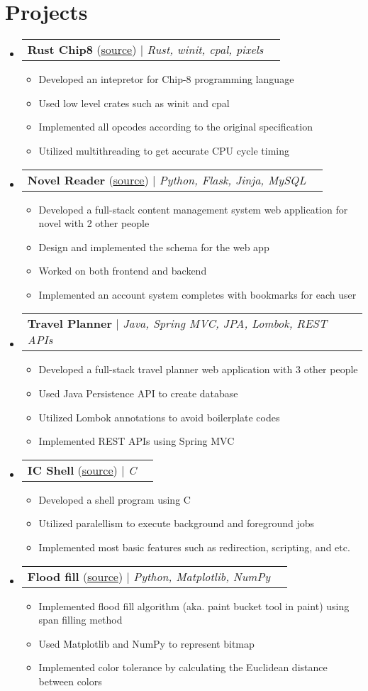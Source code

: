\documentclass[letterpaper,11pt]{article}
\makeatletter
\newcommand{\resumeItem}[1]{
  \item\small{
    {#1 \vspace{-2pt}}
  }
}
\newcommand{\resumeProjectHeading}[2]{
    \item
    \begin{tabular*}{0.97\textwidth}{l@{\extracolsep{\fill}}r}
      \small#1 & #2 \\
    \end{tabular*}\vspace{-7pt}
}
\newcommand{\resumeSubHeadingListStart}{\begin{itemize}[leftmargin=0.15in, label={}]}
\newcommand{\resumeSubHeadingListEnd}{\end{itemize}}
\newcommand{\resumeItemListStart}{\begin{itemize}}
\newcommand{\resumeItemListEnd}{\end{itemize}\vspace{-5pt}}
\makeatother
\begin{document}
\section{Projects}
    \resumeSubHeadingListStart
      \resumeProjectHeading
          {\textbf{Rust Chip8} (\href{https://github.com/fordkuppp/rust-chip8}{\underline{source}}) $|$ \emph{Rust, winit, cpal, pixels}}{}
          \resumeItemListStart
            \resumeItem{Developed an intepretor for Chip-8 programming language}
            \resumeItem{Used low level crates such as winit and cpal}
            \resumeItem{Implemented all opcodes according to the original specification}
            \resumeItem{Utilized multithreading to get accurate CPU cycle timing}
          \resumeItemListEnd
      \resumeProjectHeading
          {\textbf{Novel Reader} (\href{https://github.com/fordkuppp/novel-reader}{\underline{source}}) $|$ \emph{Python, Flask, Jinja, MySQL}}{}
          \resumeItemListStart
            \resumeItem{Developed a full-stack content management system web application for novel with 2 other people}
            \resumeItem{Design and implemented the schema for the web app}
            \resumeItem{Worked on both frontend and backend}
            \resumeItem{Implemented an account system completes with bookmarks for each user}
          \resumeItemListEnd
      \resumeProjectHeading
          {\textbf{Travel Planner} $|$ \emph{Java, Spring MVC, JPA, Lombok, REST APIs}}{}
          \resumeItemListStart
            \resumeItem{Developed a full-stack travel planner web application with 3 other people}
            \resumeItem{Used Java Persistence API to create database }
            \resumeItem{Utilized Lombok annotations to avoid boilerplate codes}
            \resumeItem{Implemented REST APIs using Spring MVC}
          \resumeItemListEnd
      \resumeProjectHeading
          {\textbf{IC Shell} (\href{https://github.com/fordkuppp/icsh}{\underline{source}}) $|$ \emph{C}}{}
          \resumeItemListStart
            \resumeItem{Developed a shell program using C }
            \resumeItem{Utilized paralellism to execute background and foreground jobs }
            \resumeItem{Implemented most basic features such as redirection, scripting, and etc. }
          \resumeItemListEnd
      \resumeProjectHeading
          {\textbf{Flood fill} (\href{https://github.com/fordkuppp/Flood-fill}{\underline{source}}) $|$ \emph{Python, Matplotlib, NumPy}}{}
          \resumeItemListStart
            \resumeItem{Implemented flood fill algorithm (aka. paint bucket tool in paint) using span filling method}
            \resumeItem{Used Matplotlib and NumPy to represent bitmap }
            \resumeItem{Implemented color tolerance by calculating the Euclidean distance between colors }
          \resumeItemListEnd
    \resumeSubHeadingListEnd
\end{document}
